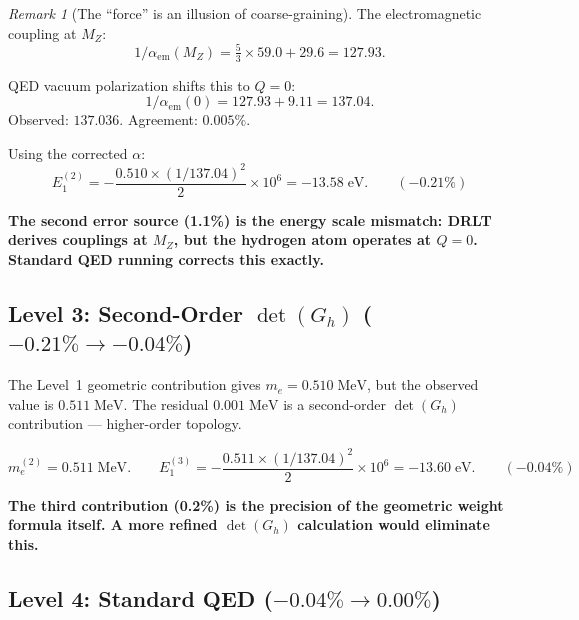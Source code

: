 \documentclass[12pt]{article}
\theoremstyle{remark}
\newtheorem{remark}[theorem]{Remark}
\theoremstyle{definition}
\begin{document}
\begin{remark}[The ``force'' is an illusion of coarse-graining]
The electromagnetic coupling at $M_Z$:
\begin{equation}
1/\alpha_\text{em}(M_Z) = \tfrac{5}{3} \times 59.0 + 29.6 = 127.93.
\end{equation}

QED vacuum polarization shifts this to $Q = 0$:
\begin{equation}
1/\alpha_\text{em}(0) = 127.93 + 9.11 = 137.04.
\end{equation}
Observed: $137.036$. Agreement: $0.005\%$.

Using the corrected $\alpha$:
\begin{equation}
E_1^{(2)} = -\frac{0.510 \times (1/137.04)^2}{2} \times 10^6 = -13.58\;\text{eV}. \qquad (-0.21\%)
\end{equation}

\textbf{The second error source (1.1\%) is the energy scale mismatch: DRLT derives couplings at $M_Z$, but the hydrogen atom operates at $Q = 0$. Standard QED running corrects this exactly.}

\subsection{Level 3: Second-Order $\det(G_h)$ ($-0.21\% \to -0.04\%$)}

The Level~1 geometric contribution gives $m_e = 0.510\;\text{MeV}$, but the observed value is $0.511\;\text{MeV}$. The residual $0.001\;\text{MeV}$ is a second-order $\det(G_h)$ contribution --- higher-order topology.

\begin{equation}
m_e^{(2)} = 0.511\;\text{MeV}. \qquad E_1^{(3)} = -\frac{0.511 \times (1/137.04)^2}{2} \times 10^6 = -13.60\;\text{eV}. \qquad (-0.04\%)
\end{equation}

\textbf{The third contribution (0.2\%) is the precision of the geometric weight formula itself. A more refined $\det(G_h)$ calculation would eliminate this.}

\subsection{Level 4: Standard QED ($-0.04\% \to 0.00\%$)}


\end{remark}
\end{document}
